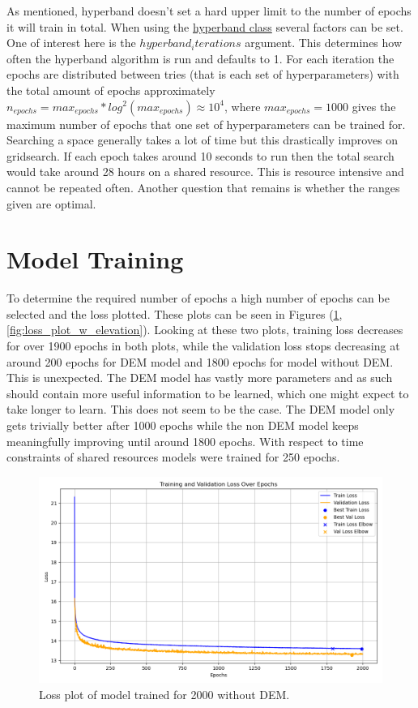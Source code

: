 As mentioned, hyperband doesn't set a hard upper limit to the number of epochs it will train in total. When using the \href{https://keras.io/api/keras_tuner/tuners/hyperband/}{hyperband class} several factors can be set. One of interest here is the $hyperband_iterations$ argument. This determines how often the hyperband algorithm is run and defaults to 1. For each iteration the epochs are distributed between tries (that is each set of hyperparameters) with the total amount of epochs approximately $n_{epochs} = max_{epochs} * log^2(max_{epochs})\approx 10^4$, where $max_{epochs} = 1000$ gives the maximum number of epochs that one set of hyperparameters can be trained for. Searching a space generally takes a lot of time but this drastically improves on gridsearch. If each epoch takes around 10 seconds to run then the total search would take around 28 hours on a shared resource. This is resource intensive and cannot be repeated often. Another question that remains is whether the ranges given are optimal.

\section{Model Training}
To determine the required number of epochs a high number of epochs can be selected and the loss plotted. These plots can be seen in Figures (\ref{fig:loss_plot_wo_elevation}, \ref{fig:loss_plot_w_elevation}). Looking at these two plots, training loss decreases for over 1900 epochs in both plots, while the validation loss stops decreasing at around 200 epochs for DEM model and 1800 epochs for model without DEM. This is unexpected. The DEM model has vastly more parameters and as such should contain more useful information to be learned, which one might expect to take longer to learn. This does not seem to be the case. The DEM model only gets trivially better after 1000 epochs while the non DEM model keeps meaningfully improving until around 1800 epochs. With respect to time constraints of shared resources models were trained for 250 epochs.

\begin{figure}
    \centering
    \includegraphics[scale = 0.6]{Figures/loss_plot_wo_elevation.png}
    \caption[Loss plot of model trained for 2000 without DEM.]{Loss plot of model trained for 2000 without DEM.}
    \label{fig:loss_plot_wo_elevation}
\end{figure}


